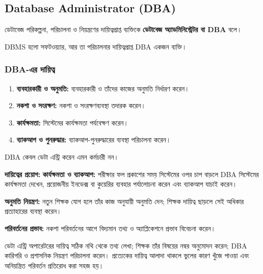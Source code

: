 \subsection{Database Administrator (DBA)}
\begin{definitionbox}{}
ডেটাবেজ পরিকল্পনা, পরিচালনা ও নিয়ন্ত্রণের দায়িত্বপ্রাপ্ত ব্যক্তিকে \textbf{ডেটাবেজ অ্যাডমিনিস্ট্রেটর বা DBA} বলে।
\end{definitionbox}
DBMS হলো সফটওয়্যার, আর তা পরিচালনার দায়িত্বপ্রাপ্ত DBA একজন ব্যক্তি।


\subsubsection{DBA-এর দায়িত্ব}
\begin{enumerate}
\item \textbf{ব্যবহারকারী ও অনুমতি:} ব্যবহারকারী ও তাঁদের কাজের অনুমতি নির্ধারণ করেন।
\item \textbf{নকশা ও সংরক্ষণ:} নকশা ও সংরক্ষণব্যবস্থা তদারক করেন।
\item \textbf{কার্যক্ষমতা:} সিস্টেমের কার্যক্ষমতা পর্যবেক্ষণ করেন।
\item \textbf{ব্যাকআপ ও পুনরুদ্ধার:} ব্যাকআপ-পুনরুদ্ধারের ব্যবস্থা পরিচালনা করেন।
\end{enumerate}
DBA কেবল ডেটা এন্ট্রি করেন এমন কর্মচারী নন।

\textbf{দায়িত্বের প্রয়োগ:}
\textbf{কার্যক্ষমতা ও ব্যাকআপ:} পরীক্ষার ফল প্রকাশের সময় সিস্টেমের ওপর চাপ বাড়লে DBA সিস্টেমের কার্যক্ষমতা দেখেন, প্রয়োজনীয় ইনডেক্স বা কুয়েরির ব্যবহার পর্যালোচনা করেন এবং ব্যাকআপ যাচাই করেন।

\textbf{অনুমতি নিয়ন্ত্রণ:} নতুন শিক্ষক যোগ হলে তাঁর কাজ অনুযায়ী অনুমতি দেন; শিক্ষক দায়িত্ব ছাড়লে সেই অধিকার প্রত্যাহারের ব্যবস্থা করেন।

\textbf{পরিবর্তনের প্রভাব:} নকশা পরিবর্তনের আগে বিদ্যমান তথ্য ও অ্যাপ্লিকেশনে প্রভাব বিবেচনা করেন।

ডেটা এন্ট্রি অপারেটরের দায়িত্ব সঠিক নথি থেকে তথ্য লেখা; শিক্ষক তাঁর বিষয়ের নম্বর অনুমোদন করেন; DBA কারিগরি ও প্রশাসনিক নিয়ন্ত্রণ পরিচালনা করেন। প্রত্যেকের দায়িত্ব আলাদা থাকলে ভুলের কারণ খুঁজে পাওয়া এবং অনিয়ন্ত্রিত পরিবর্তন প্রতিরোধ করা সহজ হয়।

